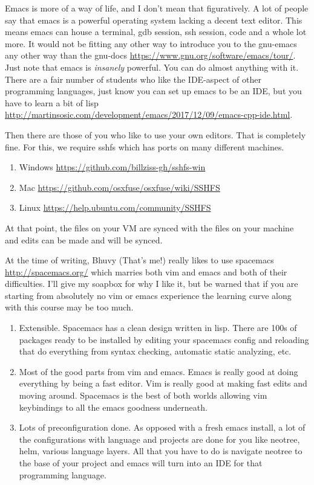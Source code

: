 Emacs is more of a way of life, and I don't mean that figuratively.
A lot of people say that emacs is a powerful operating system lacking a decent text editor.
This means emacs can house a terminal, gdb session, ssh session, code and a whole lot more.
It would not be fitting any other way to introduce you to the gnu-emacs any other way than the gnu-docs \url{https://www.gnu.org/software/emacs/tour/}.
Just note that emacs is \textit{insanely} powerful.
You can do almost anything with it.
There are a fair number of students who like the IDE-aspect of other programming languages, just know you can set up emacs to be an IDE, but you have to learn a bit of lisp \url{http://martinsosic.com/development/emacs/2017/12/09/emacs-cpp-ide.html}.

Then there are those of you who like to use your own editors. That is completely fine.
For this, we require sshfs which has ports on many different machines.

\begin{enumerate}
\item Windows \url{https://github.com/billziss-gh/sshfs-win}
\item Mac \url{https://github.com/osxfuse/osxfuse/wiki/SSHFS}
\item Linux \url{https://help.ubuntu.com/community/SSHFS}
\end{enumerate}

At that point, the files on your VM are synced with the files on your machine and edits can be made and will be synced.

At the time of writing, Bhuvy (That's me!) really likes to use spacemacs \url{http://spacemacs.org/} which marries both vim and emacs and both of their difficulties.
I'll give my soapbox for why I like it, but be warned that if you are starting from absolutely no vim or emacs experience the learning curve along with this course may be too much.
\begin{enumerate}
\item Extensible. Spacemacs has a clean design written in lisp. There are 100s of packages ready to be installed by editing your spacemacs config and reloading that do everything from syntax checking, automatic static analyzing, etc.
\item Most of the good parts from vim and emacs. Emacs is really good at doing everything by being a fast editor. Vim is really good at making fast edits and moving around. Spacemacs is the best of both worlds allowing vim keybindings to all the emacs goodness underneath.
\item Lots of preconfiguration done. As opposed with a fresh emacs install, a lot of the configurations with language and projects are done for you like neotree, helm, various language layers. All that you have to do is navigate neotree to the base of your project and emacs will turn into an IDE for that programming language.
\end{enumerate}

